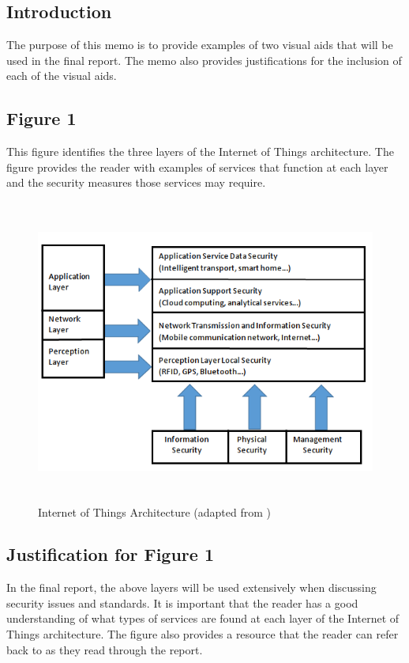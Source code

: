 \documentclass[letterpaper, 12pt]{texMemo}
\begin{document}
\maketitle
\begin{flushleft}
\subsection*{Introduction}
The purpose of this memo is to provide examples of two visual aids that will be used in the final report. The memo also provides justifications for the
inclusion of each of the visual aids.

\subsection*{Figure 1}
This figure identifies the three layers of the Internet of Things architecture. The figure provides the reader with examples of services that function at each layer and
the security measures those services may require. 

\begin{figure}[H]
	\includegraphics[width=\linewidth,height=10cm,keepaspectratio]{figure2_new.png}
	\caption{Internet of Things Architecture (adapted from \cite{Zhao6746513})}
	\label{fig:arch}
\end{figure}

\subsection*{Justification for Figure 1}
In the final report, the above layers will be used extensively when discussing security issues and standards. It is important that the reader has a good understanding of what types
of services are found at each layer of the Internet of Things architecture. The figure also provides a resource that the reader can refer back to as they read through the report.



\end{flushleft}
\end{document}
